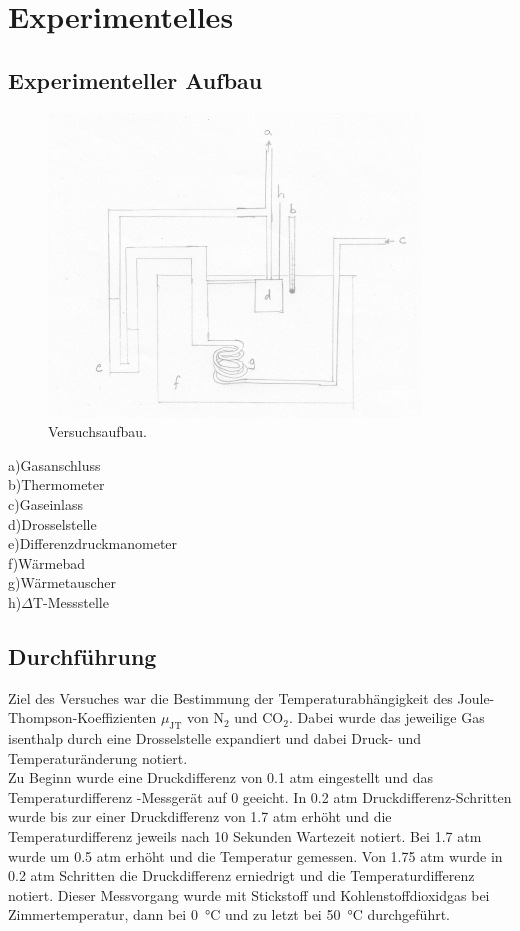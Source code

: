 \documentclass[a4paper,12pt,oneside,onecolum,final,openany]{report}
\begin{document}
\tableofcontents
\chapter{Experimentelles}
\section{Experimenteller Aufbau}
\begin{figure} [h!]
\begin{center}
\includegraphics[scale=1.2]{VersuchsaufbauJT.png} \end{center}
\caption{Versuchsaufbau.}
\end{figure}
\FloatBarrier

a)Gasanschluss\\
b)Thermometer\\
c)Gaseinlass\\
d)Drosselstelle\\
e)Differenzdruckmanometer\\
f)Wärmebad\\
g)Wärmetauscher\\
h)$\Delta$T-Messstelle\\

\section{Durchführung}
Ziel des Versuches war die Bestimmung der Temperaturabhängigkeit des Joule-Thompson-Koeffizienten $\mu_\mathrm{JT}$ von $\mathrm{N}_2$ und $\mathrm{CO}_2$. Dabei wurde das jeweilige Gas isenthalp durch eine Drosselstelle expandiert und dabei Druck- und Temperaturänderung notiert.\\

Zu Beginn wurde eine Druckdifferenz von 0.1 atm eingestellt und das Temperaturdifferenz -Messgerät auf 0 geeicht. 
In 0.2 atm Druckdifferenz-Schritten wurde bis zur einer Druckdifferenz von 1.7 atm erhöht und die Temperaturdifferenz jeweils nach 10 Sekunden Wartezeit notiert. Bei 1.7 atm wurde um 0.5 atm erhöht und die Temperatur gemessen. Von 1.75 atm wurde in 0.2 atm Schritten die Druckdifferenz erniedrigt und die Temperaturdifferenz notiert. Dieser Messvorgang wurde mit Stickstoff und Kohlenstoffdioxidgas bei Zimmertemperatur, dann bei 0~°C und zu letzt bei 50~°C durchgeführt.
\end{document}
